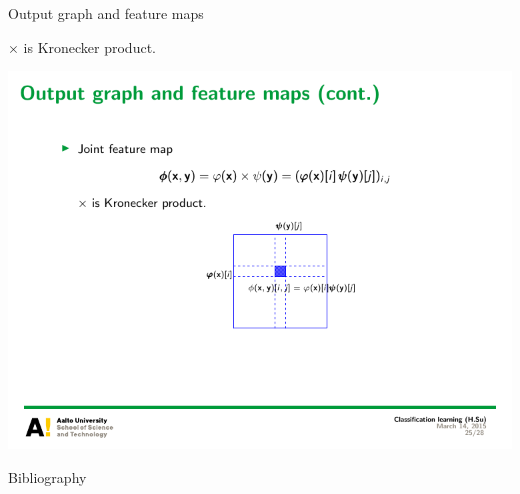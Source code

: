 \documentclass[first=dgreen,second=purple,logo=yellowexc]{aaltoslides}
\begin{document}
{\begin{frame}[allowframebreaks]{Output graph and feature maps}
\begin{itemize}
			$\times$ is Kronecker product.
		\begin{center}
			\includegraphics[scale = 0.3]{./figures/tensor_label.pdf}	
		\end{center}
	\end{itemize}
\end{frame}

\begin{frame}[allowframebreaks]{Bibliography}
%

 
\end{frame}

}
\end{document}
